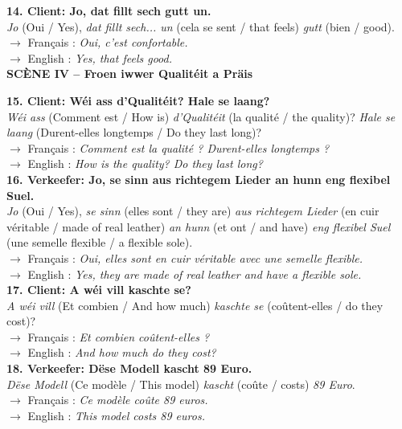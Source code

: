 \noindent\textbf{14. Client: Jo, dat fillt sech gutt un.}\\
\textit{Jo} (Oui / Yes), \textit{dat fillt sech... un} (cela se sent / that feels) \textit{gutt} (bien / good).\\
$\rightarrow$ Français : \textit{Oui, c'est confortable.}\\
$\rightarrow$ English : \textit{Yes, that feels good.}\\[0.5em]

\noindent\textbf{SCÈNE IV -- Froen iwwer Qualitéit a Präis}

\noindent\textbf{15. Client: Wéi ass d'Qualitéit? Hale se laang?}\\
\textit{Wéi ass} (Comment est / How is) \textit{d'Qualitéit} (la qualité / the quality)? \textit{Hale se laang} (Durent-elles longtemps / Do they last long)?\\
$\rightarrow$ Français : \textit{Comment est la qualité ? Durent-elles longtemps ?}\\
$\rightarrow$ English : \textit{How is the quality? Do they last long?}\\[0.5em]

\noindent\textbf{16. Verkeefer: Jo, se sinn aus richtegem Lieder an hunn eng flexibel Suel.}\\
\textit{Jo} (Oui / Yes), \textit{se sinn} (elles sont / they are) \textit{aus richtegem Lieder} (en cuir véritable / made of real leather) \textit{an hunn} (et ont / and have) \textit{eng flexibel Suel} (une semelle flexible / a flexible sole).\\
$\rightarrow$ Français : \textit{Oui, elles sont en cuir véritable avec une semelle flexible.}\\
$\rightarrow$ English : \textit{Yes, they are made of real leather and have a flexible sole.}\\[0.5em]

\noindent\textbf{17. Client: A wéi vill kaschte se?}\\
\textit{A wéi vill} (Et combien / And how much) \textit{kaschte se} (coûtent-elles / do they cost)?\\
$\rightarrow$ Français : \textit{Et combien coûtent-elles ?}\\
$\rightarrow$ English : \textit{And how much do they cost?}\\[0.5em]

\noindent\textbf{18. Verkeefer: Dëse Modell kascht 89 Euro.}\\
\textit{Dëse Modell} (Ce modèle / This model) \textit{kascht} (coûte / costs) \textit{89 Euro}.\\
$\rightarrow$ Français : \textit{Ce modèle coûte 89 euros.}\\
$\rightarrow$ English : \textit{This model costs 89 euros.}\\[0.5em]

